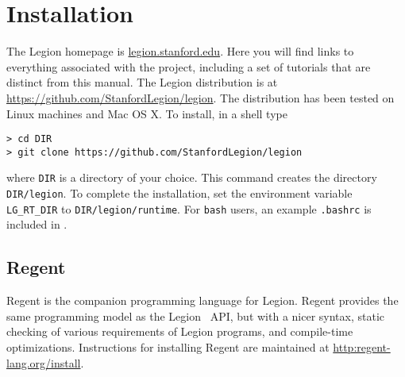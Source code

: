\chapter{Installation}
\label{chap:start}

The Legion homepage is \url{legion.stanford.edu}.  Here you will find
links to everything associated with the project, including a set of
tutorials that are distinct from this manual.  The Legion distribution is at
\url{https://github.com/StanfordLegion/legion}.  The distribution has been
tested on Linux machines and Mac OS X.  To install, in a shell type
\begin{lstlisting}
> cd DIR
> git clone https://github.com/StanfordLegion/legion
\end{lstlisting}
where {\tt DIR} is a directory of your choice.  This command creates 
the directory {\tt DIR/legion}.  To complete the installation,
set the environment variable {\tt LG\_RT\_DIR} to {\tt DIR/legion/runtime}.
For {\tt bash} users, an example {\tt .bashrc} is included in
.

\section{Regent}

Regent is the companion programming language for Legion.  Regent provides the same
programming model as the Legion \Cpp\ API, but with a nicer syntax, static checking
of various requirements of Legion programs, and compile-time optimizations.
Instructions for installing Regent are maintained at \url{http:regent-lang.org/install}.




